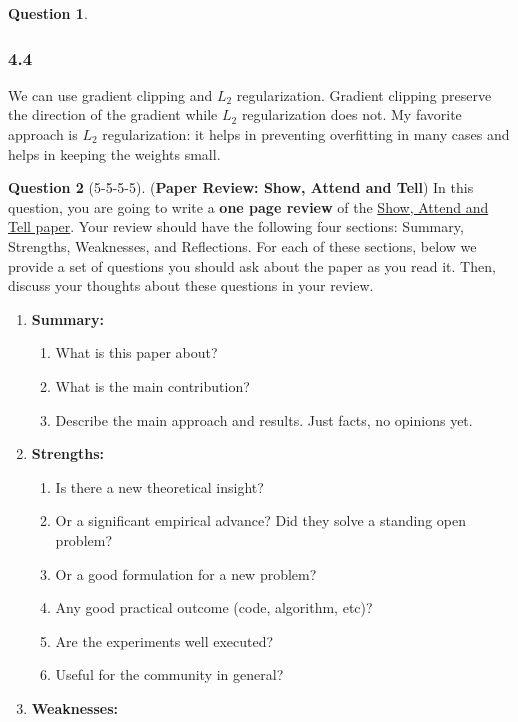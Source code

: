 \documentclass[12pt]{article}
\theoremstyle{definition}
\newtheorem{exercise}{Question}%
\begin{document}
\begin{exercise}
{    \subsubsection*{4.4}
    We can use gradient clipping and $L_{2}$ regularization. Gradient clipping
    preserve the direction of the gradient while $L_{2}$ regularization does not. My
    favorite approach is $L_{2}$ regularization: it helps in preventing
    overfitting in many cases and helps in keeping the weights small.
    }
\end{exercise}

\begin{exercise}[5-5-5-5] (\textbf{Paper Review: Show, Attend and Tell})
    In this question, you are going to write a \textbf{one page review} of the \href{https://arxiv.org/abs/1502.03044}{Show, Attend and Tell paper}. Your review should have the following four sections: Summary, Strengths, Weaknesses, and Reflections. For each of these sections, below we provide a set of questions you should ask about the paper as you read it. Then, discuss your thoughts about these questions in your review.
    \begin{enumerate}[label=(\theexercise.\arabic*)]
        \item \textbf{Summary:}
        \begin{enumerate}
            \item What is this paper about?
            \item What is the main contribution? 
            \item Describe the main approach and results. Just facts, no opinions yet. 
        \end{enumerate}
        \item \textbf{Strengths:}
        \begin{enumerate}
            \item Is there a new theoretical insight?
            \item Or a significant empirical advance? Did they solve a standing open problem? 
            \item Or a good formulation for a new problem? 
            \item Any good practical outcome (code, algorithm, etc)?
            \item Are the experiments well executed? 
            \item Useful for the community in general? 
        \end{enumerate}
        \item \textbf{Weaknesses:}

\end{enumerate}
\end{exercise}
\end{document}
